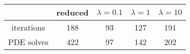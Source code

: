 \begin{tabular}{ccccc}
& reduced & $\lambda = 0.1$ & $\lambda = 1$ & $\lambda = 10$ \\
\hline
iterations & 188 & 93 & 127 & 191 \\
PDE solves & 422 & 97 & 142 & 202 \\
\hline
\end{tabular}
